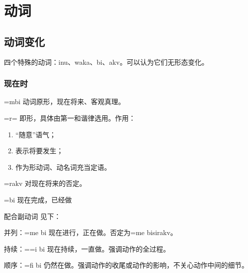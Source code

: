 \pagebreak

\section{动词}

\subsection{动词变化}

四个特殊的动词：inu、waka、bi、akv。可以认为它们无形态变化。

\subsubsection{现在时}

\begin{des}
    \item[\V=mbi] 动词原形，现在将来、客观真理。
    \item[\V=r=\AIfina]  即形，具体由第一和谐律选用。作用：
        \begin{enumerate}
            \item “随意”语气；
            \item 表示将要发生；
            \item 作为形动词、动名词充当定语。
        \end{enumerate}
    \item[\V=rakv ] 对现在将来的否定。
    \item[\V=\HA bi] 现在完成，已经做\V  
    \item[配合副动词]见下：
    \begin{des}
        \item[并列：\V=me bi] 现在进行，正在做\V 。否定为\V=me bisirakv。
        \item[持续：\V=\HA=i bi] 现在持续，一直做\V 。强调动作的全过程。
        \item[顺序：\V=fi bi] 仍然在做\V 。强调动作的收尾或动作的影响，不关心动作中间的细节。
    \end{des} 
\end{des} 

